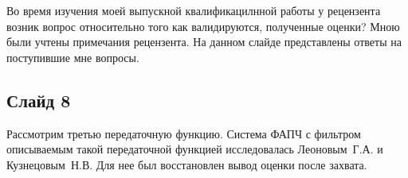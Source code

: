 \documentclass[a4paper,article,14pt]{extarticle}
\begin{document}
Во время изучения моей выпускной квалификацилнной работы у рецензента возник вопрос относительно того как валидируются, полученные оценки? Мною были учтены примечания рецензента. На данном слайде представлены ответы на поступившие мне вопросы. 

\subsection*{Слайд 8}
Рассмотрим третью передаточную функцию. Система ФАПЧ с фильтром описываемым такой передаточной функцией исследовалась Леоновым~Г.\:А. и Кузнецовым~Н.\:В. Для нее был восстановлен вывод оценки после захвата.
\end{document}
